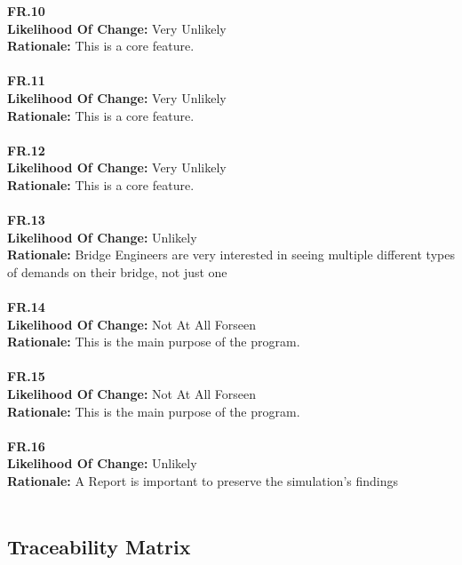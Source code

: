 \documentclass[12pt]{article}
\begin{document}
  \noindent \textbf{FR.10}\\  
  \textbf{Likelihood Of Change:} Very Unlikely\\ 
  \textbf{Rationale:} This is a core feature.\\\\

  \noindent \textbf{FR.11}\\  
  \textbf{Likelihood Of Change:} Very Unlikely\\ 
  \textbf{Rationale:} This is a core feature.\\\\

  \noindent \textbf{FR.12}\\  
  \textbf{Likelihood Of Change:} Very Unlikely\\ 
  \textbf{Rationale:} This is a core feature.\\\\

  \noindent \textbf{FR.13}\\  
  \textbf{Likelihood Of Change:} Unlikely\\ 
  \textbf{Rationale:} Bridge Engineers are very interested in seeing multiple different types of demands on their bridge, not just one\\\\

  \noindent \textbf{FR.14}\\  
  \textbf{Likelihood Of Change:} Not At All Forseen\\ 
  \textbf{Rationale:} This is the main purpose of the program.\\\\

  \noindent \textbf{FR.15}\\  
  \textbf{Likelihood Of Change:} Not At All Forseen\\ 
  \textbf{Rationale:} This is the main purpose of the program.\\\\
  
  \noindent \textbf{FR.16}\\  
  \textbf{Likelihood Of Change:} Unlikely\\ 
  \textbf{Rationale:} A Report is important to preserve the simulation's findings\\\\

\subsection{Traceability Matrix}
\end{document}
